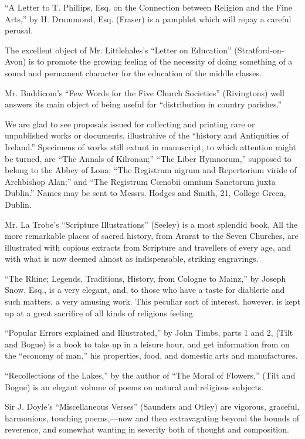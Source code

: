 ``A Letter to T. Phillips, Esq. on the Connection
between Religion and the Fine Arts,'' by H. Drummond, Esq. (Fraser) is a
pamphlet which will repay a careful perusal.

The excellent object of Mr. Littlehales's ``Letter
on Education'' (Stratford-on-Avon) is to promote the growing feeling of
the necessity of doing something of a sound and permanent character for
the education of the middle classes.

Mr. Buddicom's ``Few Words for the Five Church
Societies'' (Rivingtons) well answers its main object of being useful for
``distribution in country parishes.''

We are glad to see proposals issued for collecting
and printing rare or unpublished works or documents, illustrative of the
``history and Antiquities of Ireland.'' Specimens of works still extant in
manuscript, to which attention might be turned, are ``The Annals of
Kilronan;'' ``The Liber Hymnorum,'' supposed to belong to the Abbey
of Lona; ``The Registrum nigrum and Repertorium viride of Archbishop
Alan;'' and ``The Registrum Cœnobii omnium Sanctorum juxta Dublin.'' Names
may be sent to Messrs. Hodges and Smith, 21, College Green, Dublin.

Mr. La Trobe's ``Scripture Illustrations'' (Seeley)
is a most splendid book, All the more remarkable places of sacred
history, from Ararat to the Seven Churches, are illustrated with copious
extracts from Scripture and travellers of every age, and with what is
now deemed almost as indispensable, striking engravings.

``The Rhine; Legends, Traditions, History, from
Cologne to Mainz,'' by Joseph Snow, Esq., is a very elegant, and, to
those who have a taste for diablerie and such matters, a very amusing
work. This peculiar sort of interest, however, is kept up at a great
sacrifice of all kinds of religious feeling.

``Popular Errors explained and Illustrated,'' by John
Timbs, parts 1 and 2, (Tilt and Bogue) is a book to take up in a leisure
hour, and get information from on the ``economy of man,'' his properties,
food, and domestic arts and manufactures.

``Recollections of the Lakes,'' by the author of ``The
Moral of Flowers,'' (Tilt and Bogue) is an elegant volume of poems on
natural and religious subjects.

Sir J. Doyle's ``Miscellaneous Verses'' (Saunders and
Otley) are vigorous, graceful, harmonious, touching poems,—now and
then extravagating beyond the bounds of reverence, and somewhat wanting
in severity both of thought and composition.

